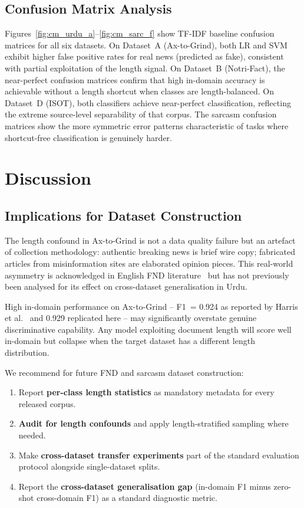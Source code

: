 \documentclass[conference]{IEEEtran}
\begin{document}
\subsection{Confusion Matrix Analysis}

Figures~\ref{fig:cm_urdu_a}--\ref{fig:cm_sarc_f}
show TF-IDF baseline confusion matrices for all six datasets.
On Dataset~A (Ax-to-Grind), both LR and SVM exhibit
higher false positive rates for real news (predicted as fake),
consistent with partial exploitation of the length signal. On
Dataset~B (Notri-Fact), the near-perfect confusion matrices confirm
that high in-domain accuracy is achievable without a length shortcut
when classes are length-balanced. On Dataset~D (ISOT), both
classifiers achieve near-perfect classification, reflecting the
extreme source-level separability of that corpus. The sarcasm
confusion matrices show the more symmetric error patterns
characteristic of tasks where shortcut-free classification is
genuinely harder.

\clearpage
\section{Discussion}
\label{sec:discussion}

\subsection{Implications for Dataset Construction}

The length confound in Ax-to-Grind is not a data quality failure but
an artefact of collection methodology: authentic breaking news is
brief wire copy; fabricated articles from misinformation sites are
elaborated opinion pieces. This real-world asymmetry is acknowledged
in English FND literature~\cite{zhou2020survey} but has not previously
been analysed for its effect on cross-dataset generalisation in Urdu.

High in-domain performance on Ax-to-Grind -- F1~= 0.924 as reported
by Harris et al.~\cite{harris2024axtogrind} and 0.929 replicated here
-- may significantly overstate genuine discriminative capability.
Any model exploiting document length will score well in-domain but
collapse when the target dataset has a different length distribution.

We recommend for future FND and sarcasm dataset construction:
\begin{enumerate}
    \item Report \textbf{per-class length statistics} as mandatory
    metadata for every released corpus.
    \item \textbf{Audit for length confounds} and apply
    length-stratified sampling where needed.
    \item Make \textbf{cross-dataset transfer experiments} part of
    the standard evaluation protocol alongside single-dataset splits.
    \item Report the \textbf{cross-dataset generalisation gap}
    (in-domain F1 minus zero-shot cross-domain F1) as a standard
    diagnostic metric.
\end{enumerate}
\end{document}
